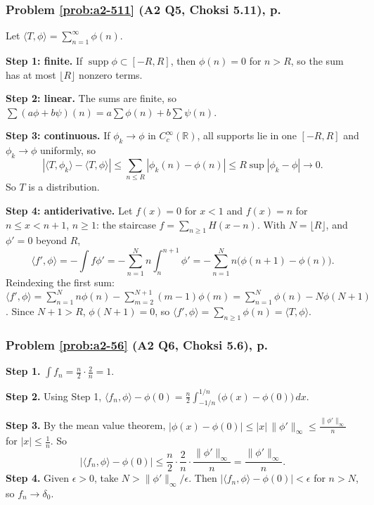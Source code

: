 \documentclass{article}
\newcommand{\R}{\mathbb{R}}
\newcommand{\D}{C_c^\infty(\R)}
\newcommand{\ip}[2]{\langle #1, #2 \rangle}
\begin{document}
\subsubsection*{Problem \ref{prob:a2-511} (A2 Q5, Choksi 5.11), p.~\pageref{prob:a2-511}}
Let $\ip{T}{\phi} = \sum_{n=1}^\infty\phi(n)$.\par
\textbf{Step 1: finite.} If $\operatorname{supp}\phi \subset [-R,R]$, then $\phi(n) = 0$ for $n > R$, so the sum has at most $\lfloor R\rfloor$ nonzero terms.\par
\textbf{Step 2: linear.} The sums are finite, so $\sum(a\phi + b\psi)(n) = a\sum\phi(n) + b\sum\psi(n)$.\par
\textbf{Step 3: continuous.} If $\phi_k \to \phi$ in $\D$, all supports lie in one $[-R,R]$ and $\phi_k \to \phi$ uniformly, so
\begin{equation*}
    |\ip{T}{\phi_k} - \ip{T}{\phi}| \leq \sum_{n\leq R}|\phi_k(n) - \phi(n)| \leq R\sup|\phi_k - \phi| \to 0.
\end{equation*}
So $T$ is a distribution.\par
\textbf{Step 4: antiderivative.} Let $f(x) = 0$ for $x < 1$ and $f(x) = n$ for $n \leq x < n+1$, $n \geq 1$: the staircase $f = \sum_{n\geq1}H(x - n)$. With $N = \lfloor R\rfloor$, and $\phi' = 0$ beyond $R$,
\begin{equation*}
    \ip{f'}{\phi} = -\int f\phi' = -\sum_{n=1}^Nn\int_n^{n+1}\phi' = -\sum_{n=1}^Nn\big(\phi(n+1) - \phi(n)\big).
\end{equation*}
Reindexing the first sum: $\ip{f'}{\phi} = \sum_{n=1}^Nn\phi(n) - \sum_{m=2}^{N+1}(m-1)\phi(m) = \sum_{n=1}^N\phi(n) - N\phi(N+1)$. Since $N + 1 > R$, $\phi(N+1) = 0$, so $\ip{f'}{\phi} = \sum_{n\geq1}\phi(n) = \ip{T}{\phi}$.

\label{sol:a2-56}
\subsubsection*{Problem \ref{prob:a2-56} (A2 Q6, Choksi 5.6), p.~\pageref{prob:a2-56}}
\textbf{Step 1.} $\int f_n = \frac n2\cdot\frac2n = 1$.\par
\textbf{Step 2.} Using Step 1, $\ip{f_n}{\phi} - \phi(0) = \frac n2\int_{-1/n}^{1/n}\big(\phi(x) - \phi(0)\big)\,dx$.\par
\textbf{Step 3.} By the mean value theorem, $|\phi(x) - \phi(0)| \leq |x|\,\|\phi'\|_\infty \leq \frac{\|\phi'\|_\infty}{n}$ for $|x| \leq \frac1n$. So
\begin{equation*}
    |\ip{f_n}{\phi} - \phi(0)| \leq \frac n2\cdot\frac2n\cdot\frac{\|\phi'\|_\infty}{n} = \frac{\|\phi'\|_\infty}{n}.
\end{equation*}
\textbf{Step 4.} Given $\epsilon > 0$, take $N > \|\phi'\|_\infty/\epsilon$. Then $|\ip{f_n}{\phi} - \phi(0)| < \epsilon$ for $n > N$, so $f_n \to \delta_0$.
\end{document}
